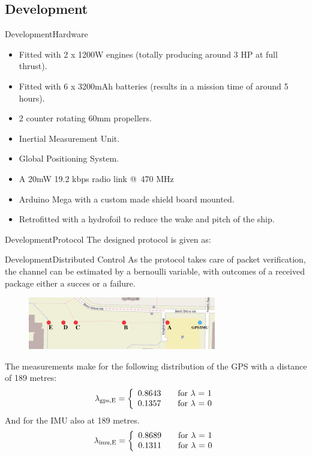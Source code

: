 \documentclass[10pt]{beamer}
\begin{document}
\subsection{Development}
\begin{frame}{Development}{Hardware}
\begin{itemize}
	\item Fitted with 2 x 1200W engines (totally producing around 3 HP at full thrust).
	\item Fitted with 6 x 3200mAh batteries (results in a mission time of around 5 hours).
	\item 2 counter rotating 60mm propellers.
	\item Inertial Measurement Unit.
	\item Global Positioning System.
	\item A 20mW 19.2 kbps radio link @ 470 MHz
	\item Arduino Mega with a custom made shield board mounted.
    \item Retrofitted with a hydrofoil to reduce the wake and pitch of the ship.
\end{itemize}
\end{frame}
\begin{frame}{Development}{Protocol}
The designed protocol is given as:
\end{frame}

\begin{frame}{Development}{Distributed Control}
As the protocol takes care of packet verification, the channel can be estimated by a bernoulli variable, with outcomes of a received package either a succes or a failure.
\begin{figure}
	\begin{center}
		\includegraphics[width=8.2cm]{img/measpoint}
		\label{fig:measpoint}
	\end{center}
\end{figure}
The measurements make for the following distribution of the GPS with a distance of 189 metres:
\begin{align}
\lambda_\text{gps,E} = \left\{ 
  \begin{array}{l l}
    0.8643 & \quad \text{for $\lambda$ = 1}\\
    0.1357 & \quad \text{for $\lambda$ = 0}
  \end{array} \right.
\end{align}
And for the IMU also at 189 metres.
\begin{align}
\lambda_\text{imu,E} = \left\{ 
  \begin{array}{l l}
    0.8689 & \quad \text{for $\lambda$ = 1}\\
    0.1311 & \quad \text{for $\lambda$ = 0}
  \end{array} \right.
\end{align}
\end{frame}
\end{document}
